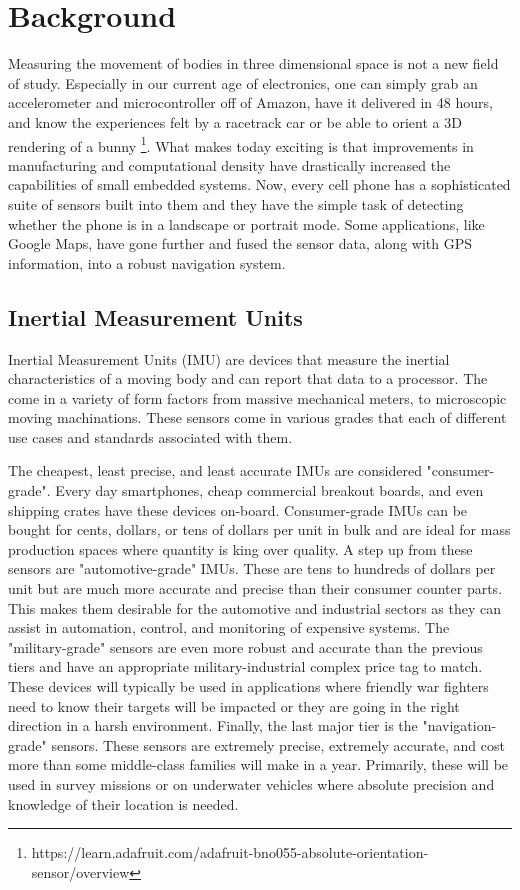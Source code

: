 \chapter{Background}\label{chap:background}
Measuring the movement of bodies in three dimensional space is not a new field of study.
Especially in our current age of electronics, one can simply grab an accelerometer and microcontroller off of Amazon, have it delivered in 48 hours, and know the experiences felt by a racetrack car or be able to orient a 3D rendering of a bunny \footnote[1]{https://learn.adafruit.com/adafruit-bno055-absolute-orientation-sensor/overview}.
What makes today exciting is that improvements in manufacturing and computational density have drastically increased the capabilities of small embedded systems.
Now, every cell phone has a sophisticated suite of sensors built into them and they have the simple task of detecting whether the phone is in a landscape or portrait mode. 
Some applications, like Google Maps, have gone further and fused the sensor data, along with GPS information, into a robust navigation system.

\section{Inertial Measurement Units} \label{sec:bkg_imu}
Inertial Measurement Units (IMU) are devices that measure the inertial characteristics of a moving body and can report that data to a processor.
The come in a variety of form factors from massive mechanical meters, to microscopic moving machinations.
These sensors come in various grades that each of different use cases and standards associated with them.

The cheapest, least precise, and least accurate IMUs are considered "consumer-grade".
Every day smartphones, cheap commercial breakout boards, and even shipping crates have these devices on-board.
Consumer-grade IMUs can be bought for cents, dollars, or tens of dollars per unit in bulk and are ideal for mass production spaces where quantity is king over quality.
A step up from these sensors are "automotive-grade" IMUs. 
These are tens to hundreds of dollars per unit but are much more accurate and precise than their consumer counter parts.
This makes them desirable for the automotive and industrial sectors as they can assist in automation, control, and monitoring of expensive systems.
The "military-grade" sensors are even more robust and accurate than the previous tiers and have an appropriate military-industrial complex price tag to match. 
These devices will typically be used in applications where friendly war fighters need to know their targets will be impacted or they are going in the right direction in a harsh environment.
Finally, the last major tier is the "navigation-grade" sensors. These sensors are extremely precise, extremely accurate, and cost more than some middle-class families will make in a year.
Primarily, these will be used in survey missions or on underwater vehicles where absolute precision and knowledge of their location is needed.

